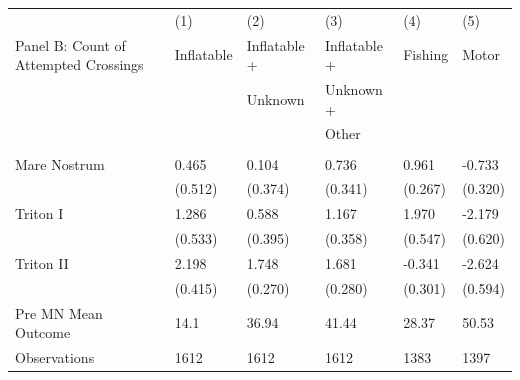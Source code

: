  \begin{tabular}{p{7cm}C{3cm}C{3cm}C{3cm}C{3cm}C{3cm}} \toprule\toprule   & (1)         & (2)       & (3)     & (4)      & (5)       \\ Panel B: Count of Attempted Crossings       & Inflatable   & Inflatable + & Inflatable + & Fishing & Motor                     \\                                            &    & Unknown & Unknown + &  &                      \\                                            &    &  & Other &  &                      \\ \hline                          &        &       &          &     &                           \\ 
Mare Nostrum        &       0.465&       0.104&       0.736&       0.961&      -0.733\\
                    &     (0.512)&     (0.374)&     (0.341)&     (0.267)&     (0.320)\\
Triton I            &       1.286&       0.588&       1.167&       1.970&      -2.179\\
                    &     (0.533)&     (0.395)&     (0.358)&     (0.547)&     (0.620)\\
Triton II           &       2.198&       1.748&       1.681&      -0.341&      -2.624\\
                    &     (0.415)&     (0.270)&     (0.280)&     (0.301)&     (0.594)\\
         \midrule Pre MN Mean Outcome  & 14.1 & 36.94 & 41.44 & 28.37 & 50.53 \\         
Observations        &        1612&        1612&        1612&        1383&        1397\\
         \bottomrule         \end{tabular}         
